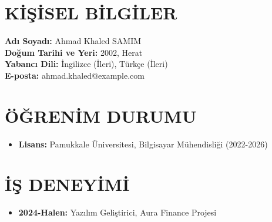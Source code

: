 \section*{KİŞİSEL BİLGİLER}
\textbf{Adı Soyadı:} Ahmad Khaled SAMIM \\
\textbf{Doğum Tarihi ve Yeri:} 2002, Herat \\
\textbf{Yabancı Dili:} İngilizce (İleri), Türkçe (İleri) \\
\textbf{E-posta:} ahmad.khaled@example.com

\section*{ÖĞRENİM DURUMU}
\begin{itemize}
    \item \textbf{Lisans:} Pamukkale Üniversitesi, Bilgisayar Mühendisliği (2022-2026)
\end{itemize}

\section*{İŞ DENEYİMİ}
\begin{itemize}
    \item \textbf{2024-Halen:} Yazılım Geliştirici, Aura Finance Projesi
\end{itemize}
